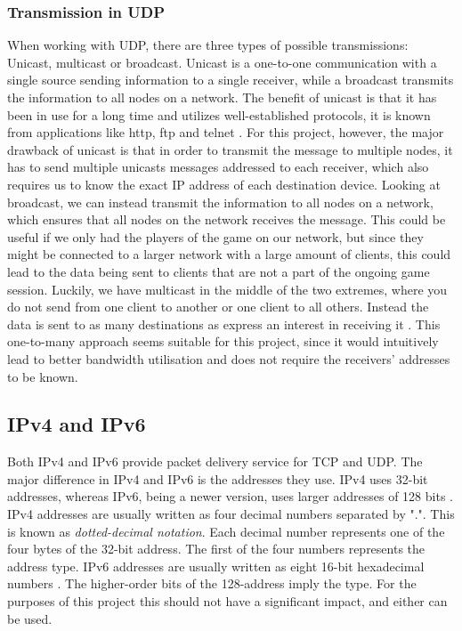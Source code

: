 \subsubsection{Transmission in UDP}
When working with UDP, there are three types of possible transmissions: Unicast, multicast or broadcast.
Unicast is a one-to-one communication with a single source sending information to a single receiver, while a broadcast transmits the information to all nodes on a network.
The benefit of unicast is that it has been in use for a long time and utilizes well-established protocols, it is known from applications like http, ftp and telnet \cite{finjan}.
For this project, however, the major drawback of unicast is that in order to transmit the message to multiple nodes, it has to send multiple unicasts messages addressed to each receiver, which also requires us to know the exact IP address of each destination device.
Looking at broadcast, we can instead transmit the information to all nodes on a network, which ensures that all nodes on the network receives the message.
This could be useful if we only had the players of the game on our network, but since they might be connected to a larger network with a large amount of clients, this could lead to the data being sent to clients that are not a part of the ongoing game session.
Luckily, we have multicast in the middle of the two extremes, where you do not send from one client to another or one client to all others.
Instead the data is sent to as many destinations as express an interest in receiving it \cite{finjan}.
This one-to-many approach seems suitable for this project, since it would intuitively lead to better bandwidth utilisation and does not require the receivers' addresses to be known.

\subsection{IPv4 and IPv6}\label{ipv4-ipv6}
Both IPv4 and IPv6 provide packet delivery service for TCP and UDP.
The major difference in IPv4 and IPv6 is the addresses they use.
IPv4 uses 32-bit addresses, whereas IPv6, being a newer version, uses larger addresses of 128 bits \cite{socketnetworking}.
IPv4 addresses are usually written as four decimal numbers separated by ".".
This is known as \textit{dotted-decimal notation}.
Each decimal number represents one of the four bytes of the 32-bit address.
The first of the four numbers represents the address type.
IPv6 addresses are usually written as eight 16-bit hexadecimal numbers \cite{socketnetworking}.
The higher-order bits of the 128-address imply the type.
For the purposes of this project this should not have a significant impact, and either can be used.
